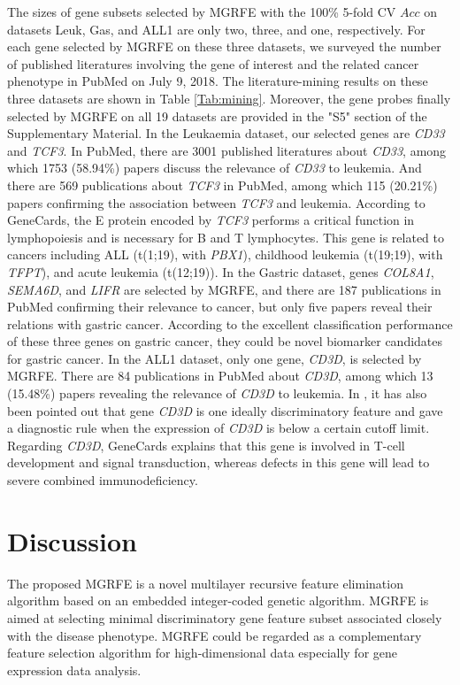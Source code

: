\documentclass[10pt,journal,compsoc]{IEEEtran}
\begin{document}
	The sizes of gene subsets selected by MGRFE with the 100\% 5-fold CV $Acc$ on datasets Leuk, Gas, and ALL1 are only two, three, and one, respectively.
	For each gene selected by MGRFE on these three datasets, we surveyed the number of published literatures involving the gene of interest and the related cancer phenotype in PubMed on July 9, 2018. The literature-mining results on these three datasets are shown in Table \ref{Tab:mining}. Moreover, the gene probes finally selected by MGRFE on all 19 datasets are provided in the "S5" section of the Supplementary Material.
	In the Leukaemia dataset, our selected genes are \textit{CD33} and \textit{TCF3}. In PubMed, there are 3001 published literatures about \textit{CD33}, among which 1753 (58.94\%) papers discuss the relevance of \textit{CD33} to leukemia. And there are 569 publications about \textit{TCF3} in PubMed, among which 115 (20.21\%) papers confirming the association between \textit{TCF3} and leukemia. According to GeneCards, the E protein encoded by \textit{TCF3} performs a critical function in lymphopoiesis and is necessary for B and T lymphocytes. This gene is related to cancers including ALL (t(1;19), with \textit{PBX1}), childhood leukemia (t(19;19), with \textit{TFPT}), and acute leukemia (t(12;19)). In the Gastric dataset, genes \textit{COL8A1}, \textit{SEMA6D}, and \textit{LIFR} are selected by MGRFE, and there are 187 publications in PubMed confirming their relevance to cancer, but only five papers reveal their relations with gastric cancer. According to the excellent classification performance of these three genes on gastric cancer, they could be novel biomarker candidates for gastric cancer. In the ALL1 dataset, only one gene, \textit{CD3D}, is selected by MGRFE. There are 84 publications in PubMed about \textit{CD3D}, among which 13 (15.48\%) papers revealing the relevance of \textit{CD3D} to leukemia. In \cite{Y34}, it has also been pointed out that gene \textit{CD3D} is one ideally discriminatory feature and gave a diagnostic rule when the expression of \textit{CD3D} is below a certain cutoff limit. Regarding \textit{CD3D}, GeneCards explains that this gene is involved in T-cell development and signal transduction, whereas defects in this gene will lead to severe combined immunodeficiency.

	\section{Discussion}
	
	The proposed MGRFE is a novel multilayer recursive feature elimination algorithm based on an embedded integer-coded genetic algorithm. MGRFE is aimed at selecting minimal discriminatory gene feature subset associated closely with the disease phenotype. 
	MGRFE could be regarded as a complementary feature selection algorithm for high-dimensional data especially for gene expression data analysis. 
	
\end{document}
